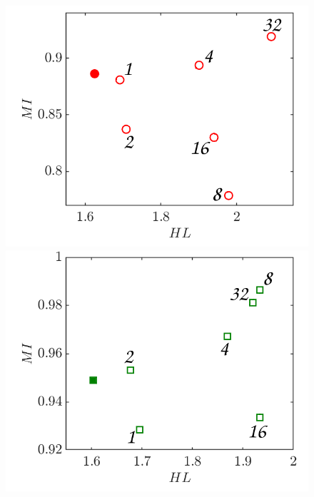 \documentclass[%
 aip,
 amsmath,amssymb,
 reprint,
]{revtex4-1}
\begin{document}
\vspace{0.45cm} 
\begin{figure}
	\begin{center}
		\begin{minipage}[c]{0.3\linewidth}
			\includegraphics[width=1\linewidth,trim=0.5cm 0cm 0cm 0cm,clip]{Figures/MI_8h_HL_1.png}
		\end{minipage}
		\begin{minipage}[c]{0.3\linewidth}
			\includegraphics[width=1\linewidth,trim=0.5cm 0cm 0cm 0cm,clip]{Figures/MI_8h_HL_2.png}
		\end{minipage}
		\begin{minipage}[c]{0.3\linewidth}

\end{minipage}
\end{center}
\end{figure}
\end{document}
